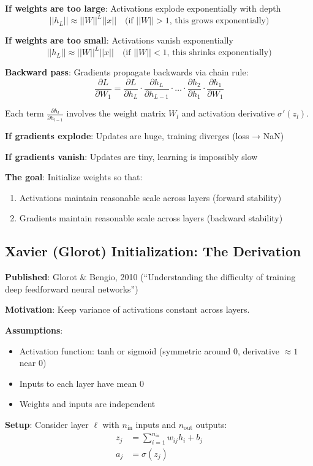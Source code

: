 \textbf{If weights are too large}: Activations explode exponentially with depth
\[
||h_L|| \approx ||W||^L ||x|| \quad \text{(if } ||W|| > 1\text{, this grows exponentially)}
\]

\textbf{If weights are too small}: Activations vanish exponentially
\[
||h_L|| \approx ||W||^L ||x|| \quad \text{(if } ||W|| < 1\text{, this shrinks exponentially)}
\]

\textbf{Backward pass}: Gradients propagate backwards via chain rule:
\[
\frac{\partial L}{\partial W_1} = \frac{\partial L}{\partial h_L} \cdot \frac{\partial h_L}{\partial h_{L-1}} \cdot \ldots \cdot \frac{\partial h_2}{\partial h_1} \cdot \frac{\partial h_1}{\partial W_1}
\]

Each term $\frac{\partial h_l}{\partial h_{l-1}}$ involves the weight matrix $W_l$ and activation derivative $\sigma'(z_l)$.

\textbf{If gradients explode}: Updates are huge, training diverges (loss → NaN)

\textbf{If gradients vanish}: Updates are tiny, learning is impossibly slow

\textbf{The goal}: Initialize weights so that:
\begin{enumerate}
\item Activations maintain reasonable scale across layers (forward stability)
\item Gradients maintain reasonable scale across layers (backward stability)
\end{enumerate}

\subsection{Xavier (Glorot) Initialization: The Derivation}

\textbf{Published}: Glorot \& Bengio, 2010 (``Understanding the difficulty of training deep feedforward neural networks'')

\textbf{Motivation}: Keep variance of activations constant across layers.

\textbf{Assumptions}:
\begin{itemize}
\item Activation function: tanh or sigmoid (symmetric around 0, derivative $\approx 1$ near 0)
\item Inputs to each layer have mean 0
\item Weights and inputs are independent
\end{itemize}

\textbf{Setup}: Consider layer $\ell$ with $n_{\text{in}}$ inputs and $n_{\text{out}}$ outputs:
\begin{align*}
z_j &= \sum_{i=1}^{n_{\text{in}}} w_{ij} h_i + b_j \\
a_j &= \sigma(z_j)
\end{align*}

